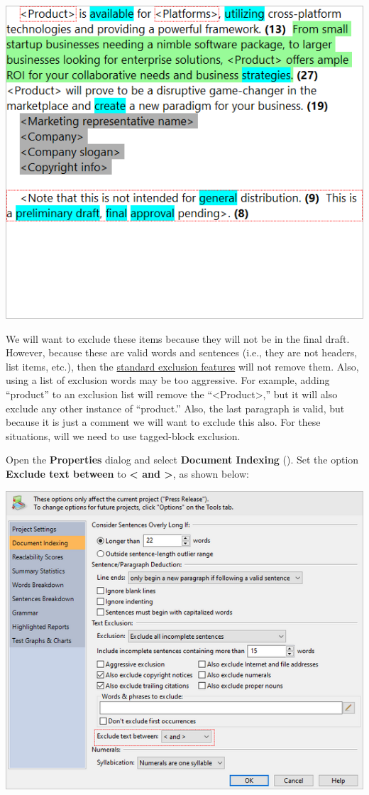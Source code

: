 \documentclass[
]{book}
\theoremstyle{definition}
\theoremstyle{definition}
\theoremstyle{definition}
\theoremstyle{definition}
\theoremstyle{remark}
\begin{document}
\includegraphics{Images/ExclusionTagsExampleNotExcluding.png}

We will want to exclude these items because they will not be in the final draft. However, because these are valid words and sentences (i.e., they are not headers, list items, etc.), then the \protect\hyperlink{options-text-exclusion}{standard exclusion features} will not remove them. Also, using a list of exclusion words may be too aggressive. For example, adding ``product'' to an exclusion list will remove the ``\textless Product\textgreater,'' but it will also exclude any other instance of ``product.'' Also, the last paragraph is valid, but because it is just a comment we will want to exclude this also. For these situations, will we need to use tagged-block exclusion.

Open the \textbf{Properties} dialog and select \textbf{Document Indexing} (). Set the option \textbf{Exclude text between} to \textbf{\textless{} and \textgreater{}}, as shown below:

\includegraphics{Images/ExclusionTagsExampleOptions.png}
\end{document}
